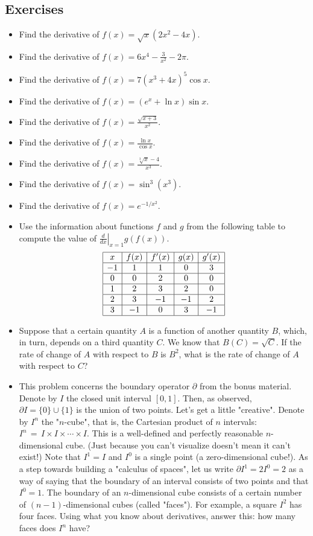 \documentclass[twoside,openright,titlepage,a4paper]{book}
\begin{document}
\begin{sloppypar}
\subsection{Exercises}
\begin{itemize}
\item Find the derivative of $f(x)= \sqrt{x}(2x^2-4x)$.
\item Find the derivative of $\displaystyle f(x) = 6x^4 -\frac{3}{x^2}-2\pi$.
\item Find the derivative of $f(x) = 7(x^3+4x)^5 \cos x$.
\item Find the derivative of $f(x) = (e^x + \ln x)\sin x$.
\item Find the derivative of $\displaystyle f(x) = \frac{\sqrt{x+3}}{x^2}$.
\item Find the derivative of $\displaystyle f(x) = \frac{\ln x}{\cos x}$.
\item Find the derivative of $\displaystyle f(x) = \frac{ \sqrt[3]{x} - 4}{x^3}$.
\item Find the derivative of $f(x)=\sin^3 (x^3)$.
\item Find the derivative of $f(x) = e^{-1/x^2}$.
\item Use the information about functions $f$ and $g$ from the following table to compute the value of $\displaystyle \left. \frac{d}{dx} \right|_{x=1}g(f(x))$.
\[
\begin{array}{|c|c|c|c|c|}\hline
x& f(x) & f'(x) & g(x) & g'(x) \\ \hline
-1 & 1 & 1 & 0 & 3 \\ \hline
0 & 0 & 2 & 0 &  0\\ \hline
1 & 2 & 3 & 2 &  0 \\ \hline
2 & 3 & -1 & -1 & 2 \\ \hline
3 & -1 & 0 & 3 & -1 \\ \hline
\end{array}
\]
\item Suppose that a certain quantity $A$ is a function of another quantity $B$, which, in turn, depends on a third quantity $C$. We know that $B(C) = \sqrt{C}$. If the rate of change of $A$ with respect to $B$ is $B^2$, what is the rate of change of $A$ with respect to $C$?
\item This problem concerns the boundary operator $\partial$ from the bonus material. Denote by $I$ the closed unit interval $[0,1]$. Then, as observed, $\partial I = \{0\} \cup \{1\}$ is the union of two points. Let's get a little "creative". Denote by $I^n$ the "$n$-cube", that is, the Cartesian product of $n$ intervals: $I^n \, = \, I \times I \times \cdots \times I$. This is a well-defined and perfectly reasonable $n$-dimensional cube. (Just because you can't visualize doesn't mean it can't exist!) Note that $I^1=I$ and $I^0$ is a single point (a zero-dimensional cube!). As a step towards building a "calculus of spaces", let us write $\partial I^1 = 2I^0 = 2$ as a way of saying that the boundary of an interval consists of two points and that $I^0=1$. The boundary of an $n$-dimensional cube consists of a certain number of $(n-1)$-dimensional cubes (called "faces"). For example, a square $I^2$ has four faces. Using what you know about derivatives, answer this: how many faces does $I^n$ have?

\end{itemize}
\end{sloppypar}
\end{document}
